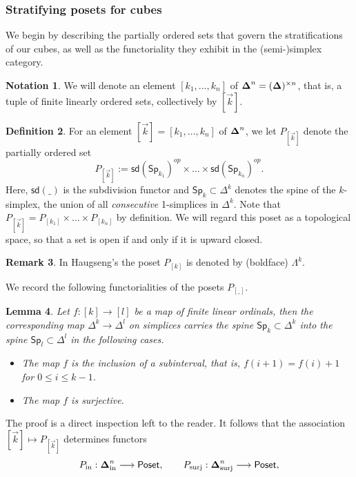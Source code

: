 \documentclass[10pt, reqno, twoside
, final
]{amsart}
\numberwithin{equation}{subsection}%
\theoremstyle{definition}
\newtheorem{defn}{Definition}[subsection]
\theoremstyle{definition}
\theoremstyle{definition}
\newtheorem{nota}[defn]{Notation}
\theoremstyle{definition}
\theoremstyle{definition}
\theoremstyle{definition}
\theoremstyle{definition}
\theoremstyle{definition}
\theoremstyle{definition}
\theoremstyle{plain}
\theoremstyle{definition}
\theoremstyle{plain}
\theoremstyle{definition}
\theoremstyle{plain}
\theoremstyle{definition}
\newtheorem{rmk}[defn]{Remark}
\theoremstyle{definition}
\theoremstyle{plain}
\newtheorem{lem}[defn]{Lemma}
\theoremstyle{plain}
\theoremstyle{definition}
\theoremstyle{plain}
\theoremstyle{plain}
\theoremstyle{plain}
\begin{document}
\subsubsection{Stratifying posets for cubes}
We begin by describing the partially ordered sets that govern the stratifications of our cubes, as well as the functoriality they exhibit in the (semi-)simplex category.
\begin{nota}
We will denote an element $[k_1,\ldots,k_n]$ of $\boldsymbol{\Delta}^{n}=(\boldsymbol{\Delta})^{\times n}$, that is, a tuple of finite linearly ordered sets, collectively by $[\vec{k}]$.
\end{nota}
\begin{defn}
For an element $[\vec{k}]=[k_1,\ldots,k_n]$ of $\boldsymbol{\Delta}^n$, we let $P_{[\vec{k}]}$ denote the partially ordered set
\[  P_{[\vec{k}]}:=\mathsf{sd}(\mathsf{Sp}_{k_1})^{op}\times \ldots \times \mathsf{sd}(\mathsf{Sp}_{k_n})^{op}.  \]
Here, $\mathsf{sd}(\_)$ is the subdivision functor and $\mathsf{Sp}_k\subset \Delta^k$ denotes the spine of the $k$-simplex, the union of all \emph{consecutive} 1-simplices in $\Delta^k$. Note that $P_{[\vec{k}]}=P_{[k_1]}\times\ldots \times P_{[k_n]}$ by definition. We will regard this poset as a topological space, so that a set is open if and only if it is upward closed.      
\end{defn}
\begin{rmk}
    In Haugseng's \cite[Definition 5.2]{Haugseng-iteratedspans} the poset $P_{[k]}$ is denoted by (boldface) $\Lambda^k$.
\end{rmk}
We record the following functorialities of the posets $P_{[\_]}$.
\begin{lem}\label{lem:functorposet}
Let $f:[k]\rightarrow [l]$ be a map of finite linear ordinals, then the corresponding map $\Delta^k\rightarrow \Delta^l$ on simplices carries the spine $\mathsf{Sp}_k\subset \Delta^k$ into the spine $\mathsf{Sp}_l\subset \Delta^l$ in the following cases.
\begin{itemize}
    \item The map $f$ is the inclusion of a subinterval, that is, $f(i+1)=f(i)+1$ for $0\leq i\leq k-1$.
    \item The map $f$ is surjective.
\end{itemize}
\end{lem}
The proof is a direct inspection left to the reader. It follows that the association $[\vec{k}]\mapsto P_{[\vec{k}]}$ determines functors
\[ P_{\mathrm{in}}:\boldsymbol{\Delta}^n_{\mathrm{in}} \longrightarrow \mathsf{Poset}, \quad \quad  P_{\mathrm{surj}}:\boldsymbol{\Delta}^n_{\mathrm{surj}} \longrightarrow \mathsf{Poset}, \]
\end{document}

